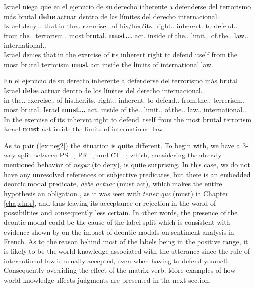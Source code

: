 \begin{exe}
  \ex\label{ex:neg2}
    \begin{xlist}
      \item{\gll Israel niega que en el ejercicio de su derecho inherente a defenderse del terrorismo más brutal \textbf{debe} actuar dentro de los límites del derecho internacional.\\ Israel deny.\Prs.\Ind.\Tsg{} that in the.\M.\Sg{} exercise.\M.\Sg{} of his/her/its.\Sg{} right.\M.\Sg{} inherent.\Sg{} to defend.\Inf.\Refl{} from.the.\M.\Sg{} terrorism.\M.\Sg{} most brutal.\Sg{} \textbf{must.\Prs.\Ind.\Tsg{}} act.\Inf{} inside of the.\M.\Pl{} limit.\M.\Pl{} of.the.\M.\Pl{} law.\M.\Sg{} international.\M.\Sg{} \\\glt Israel denies that in the exercise of its inherent right to defend itself from the most brutal terrorism \textbf{must} act inside the limits of international law.}
      \item{\gll En el ejercicio de su derecho inherente a defenderse del terrorismo más brutal Israel \textbf{debe} actuar dentro de los límites del derecho internacional.\\ in the.\M.\Sg{} exercise.\M.\Sg{} of his.her.its.\Sg{} right.\M.\Sg{} inherent.\Sg{} to  defend.\Inf.\Refl{} from.the.\M.\Sg{} terrorism.\M.\Sg{} most brutal.\Sg{} Israel \textbf{must.\Prs.\Ind.\Tsg{}} act.\Inf{} inside of the.\M.\Pl{} limit.\M.\Pl{} of.the.\M.\Pl{} law.\M.\Sg{} international.\M.\Sg{} \\\glt In the exercise of its inherent right to defend itself from the most brutal terrorism Israel \textbf{must} act inside the limits of international law.} \label{ex:hypneg2}
    \end{xlist}
\end{exe}

As to pair (\ref{ex:neg2}) the situation is quite different. To begin with, we have a 3-way split between PS+, PR+, and CT+; which, considering the already mentioned behavior of \textit{negar} (to deny), is quite surprising. In this case, we do not have any unresolved references or subjective predicates, but there is an embedded deontic modal predicate, \textit{debe actuar} (must act), which makes the entire hypothesis an obligation \citep{morante2012modality}, as it was seen with \textit{tener que} (must) in Chapter \ref{chap:intr}, and thus leaving its acceptance or rejection in the world of possibilities and consequently less certain. In other words, the presence of the deontic modal could be the cause of the label split which is consistent with evidence shown by \citet{benamara2012negation} on the impact of deontic modals on sentiment analysis in French. As to the reason behind most of the labels being in the positive range, it is likely to be the world knowledge associated with the utterance since the rule of international law is usually accepted, even when having to defend yourself. Consequently overriding the effect of the matrix verb. More examples of how world knowledge affects judgments are presented in the next section.\\

